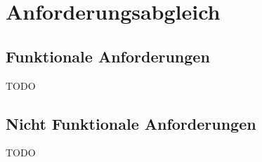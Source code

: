 \chapter{Anforderungsabgleich}
\label{cha:anforderungsabgleich}

\section{Funktionale Anforderungen}
\label{sec:anforderungsabgleich:funktional}
TODO


\section{Nicht Funktionale Anforderungen}
\label{sec:anforderungsabgleich:nichtfunktional}
TODO